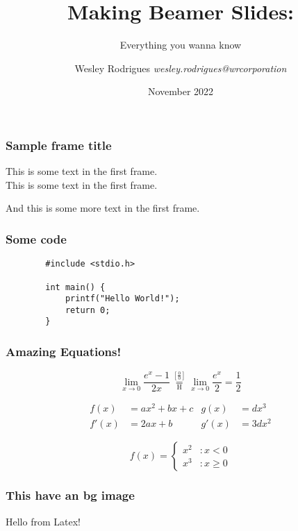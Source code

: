 \documentclass[aspectratio=169,table,xcdraw,18pt]{beamer}
\title{Making Beamer Slides:}
\subtitle{Everything you wanna know}
\author{
    \texorpdfstring{
        Wesley Rodrigues \textit{wesley.rodrigues@wrcorporation}
    }{}}
\institute{Wesley R. Corporation}
\date{\small{November 2022}}
\begin{document}

{
\frame{\titlepage}
}


\begin{frame}
    \frametitle{Sample frame title}
    This is some text in the first frame.\\
    This is some text in the first frame.

    And this is some more text in the first frame.
\end{frame}


\begin{frame}[fragile]
    \frametitle{Some code}

    \begin{verbatim}
        #include <stdio.h>

        int main() {
            printf("Hello World!");
            return 0;
        }
    \end{verbatim}
\end{frame}


\begin{frame}
    \frametitle{Amazing Equations!}
    \[
        \lim_{x\to 0}{\frac{e^x-1}{2x}}
        \overset{\left[\frac{0}{0}\right]}{\underset{\mathrm{H}}{=}}
        \lim_{x\to 0}{\frac{e^x}{2}}={\frac{1}{2}}
    \]

    \begin{align*}
        f(x)  & = a x^2+b x +c & g(x)  & = d x^3   \\
        f'(x) & = 2 a x +b     & g'(x) & = 3 d x^2
    \end{align*}

    \[f(x) = \left\{
        \begin{array}{lr}
            x^2 & : x < 0   \\
            x^3 & : x \ge 0
        \end{array}
        \right.
    \]
\end{frame}


{
\begin{frame}
    \frametitle{This have an bg image}
    Hello from Latex!
\end{frame}
}
\end{document}
